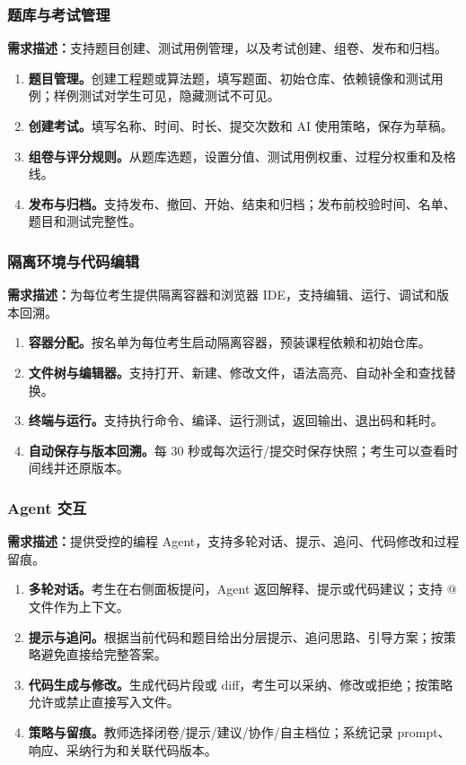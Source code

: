 \documentclass[UTF8,12pt,a4paper]{ctexart}
\begin{document}
\subsubsection{题库与考试管理}

\textbf{需求描述：}支持题目创建、测试用例管理，以及考试创建、组卷、发布和归档。

\begin{enumerate}[leftmargin=2em,itemsep=2pt]
  \item \textbf{题目管理。}创建工程题或算法题，填写题面、初始仓库、依赖镜像和测试用例；样例测试对学生可见，隐藏测试不可见。
  \item \textbf{创建考试。}填写名称、时间、时长、提交次数和 AI 使用策略，保存为草稿。
  \item \textbf{组卷与评分规则。}从题库选题，设置分值、测试用例权重、过程分权重和及格线。
  \item \textbf{发布与归档。}支持发布、撤回、开始、结束和归档；发布前校验时间、名单、题目和测试完整性。
\end{enumerate}

\subsubsection{隔离环境与代码编辑}

\textbf{需求描述：}为每位考生提供隔离容器和浏览器 IDE，支持编辑、运行、调试和版本回溯。

\begin{enumerate}[leftmargin=2em,itemsep=2pt]
  \item \textbf{容器分配。}按名单为每位考生启动隔离容器，预装课程依赖和初始仓库。
  \item \textbf{文件树与编辑器。}支持打开、新建、修改文件，语法高亮、自动补全和查找替换。
  \item \textbf{终端与运行。}支持执行命令、编译、运行测试，返回输出、退出码和耗时。
  \item \textbf{自动保存与版本回溯。}每 30 秒或每次运行/提交时保存快照；考生可以查看时间线并还原版本。
\end{enumerate}

\subsubsection{Agent 交互}

\textbf{需求描述：}提供受控的编程 Agent，支持多轮对话、提示、追问、代码修改和过程留痕。

\begin{enumerate}[leftmargin=2em,itemsep=2pt]
  \item \textbf{多轮对话。}考生在右侧面板提问，Agent 返回解释、提示或代码建议；支持 @ 文件作为上下文。
  \item \textbf{提示与追问。}根据当前代码和题目给出分层提示、追问思路、引导方案；按策略避免直接给完整答案。
  \item \textbf{代码生成与修改。}生成代码片段或 diff，考生可以采纳、修改或拒绝；按策略允许或禁止直接写入文件。
  \item \textbf{策略与留痕。}教师选择闭卷/提示/建议/协作/自主档位；系统记录 prompt、响应、采纳行为和关联代码版本。
\end{enumerate}
\end{document}
